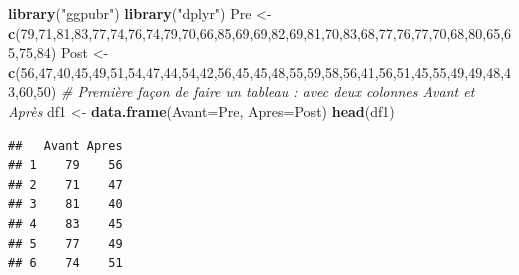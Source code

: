 \documentclass[
  11pt,
  french,
]{book}
\makeatletter
\newenvironment{Shaded}{\begin{snugshade}}{\end{snugshade}}
\newcommand{\CommentTok}[1]{\textcolor[rgb]{0.56,0.35,0.01}{\textit{#1}}}
\newcommand{\DataTypeTok}[1]{\textcolor[rgb]{0.13,0.29,0.53}{#1}}
\newcommand{\DecValTok}[1]{\textcolor[rgb]{0.00,0.00,0.81}{#1}}
\newcommand{\KeywordTok}[1]{\textcolor[rgb]{0.13,0.29,0.53}{\textbf{#1}}}
\newcommand{\NormalTok}[1]{#1}
\newcommand{\StringTok}[1]{\textcolor[rgb]{0.31,0.60,0.02}{#1}}
\newenvironment{kframe}{%
\medskip{}
\setlength{\fboxsep}{.8em}
 \def\at@end@of@kframe{}%
 \ifinner\ifhmode%
  \def\at@end@of@kframe{\end{minipage}}%
  \begin{minipage}{\columnwidth}%
 \fi\fi%
 \def\FrameCommand##1{\hskip\@totalleftmargin \hskip-\fboxsep
 \colorbox{shadecolor}{##1}\hskip-\fboxsep
     \hskip-\linewidth \hskip-\@totalleftmargin \hskip\columnwidth}%
 \MakeFramed {\advance\hsize-\width
   \@totalleftmargin\z@ \linewidth\hsize
   \@setminipage}}%
 {\par\unskip\endMakeFramed%
 \at@end@of@kframe}
\renewenvironment{Shaded}{\begin{kframe}}{\end{kframe}}
\makeatother
\begin{document}
\begin{Shaded}
\begin{Highlighting}[]
\KeywordTok{library}\NormalTok{(}\StringTok{"ggpubr"}\NormalTok{)}
\KeywordTok{library}\NormalTok{(}\StringTok{"dplyr"}\NormalTok{)}
\NormalTok{Pre <-}\StringTok{ }\KeywordTok{c}\NormalTok{(}\DecValTok{79}\NormalTok{,}\DecValTok{71}\NormalTok{,}\DecValTok{81}\NormalTok{,}\DecValTok{83}\NormalTok{,}\DecValTok{77}\NormalTok{,}\DecValTok{74}\NormalTok{,}\DecValTok{76}\NormalTok{,}\DecValTok{74}\NormalTok{,}\DecValTok{79}\NormalTok{,}\DecValTok{70}\NormalTok{,}\DecValTok{66}\NormalTok{,}\DecValTok{85}\NormalTok{,}\DecValTok{69}\NormalTok{,}\DecValTok{69}\NormalTok{,}\DecValTok{82}\NormalTok{,}\DecValTok{69}\NormalTok{,}\DecValTok{81}\NormalTok{,}\DecValTok{70}\NormalTok{,}\DecValTok{83}\NormalTok{,}\DecValTok{68}\NormalTok{,}\DecValTok{77}\NormalTok{,}\DecValTok{76}\NormalTok{,}\DecValTok{77}\NormalTok{,}\DecValTok{70}\NormalTok{,}\DecValTok{68}\NormalTok{,}\DecValTok{80}\NormalTok{,}\DecValTok{65}\NormalTok{,}\DecValTok{65}\NormalTok{,}\DecValTok{75}\NormalTok{,}\DecValTok{84}\NormalTok{)}
\NormalTok{Post <-}\StringTok{ }\KeywordTok{c}\NormalTok{(}\DecValTok{56}\NormalTok{,}\DecValTok{47}\NormalTok{,}\DecValTok{40}\NormalTok{,}\DecValTok{45}\NormalTok{,}\DecValTok{49}\NormalTok{,}\DecValTok{51}\NormalTok{,}\DecValTok{54}\NormalTok{,}\DecValTok{47}\NormalTok{,}\DecValTok{44}\NormalTok{,}\DecValTok{54}\NormalTok{,}\DecValTok{42}\NormalTok{,}\DecValTok{56}\NormalTok{,}\DecValTok{45}\NormalTok{,}\DecValTok{45}\NormalTok{,}\DecValTok{48}\NormalTok{,}\DecValTok{55}\NormalTok{,}\DecValTok{59}\NormalTok{,}\DecValTok{58}\NormalTok{,}\DecValTok{56}\NormalTok{,}\DecValTok{41}\NormalTok{,}\DecValTok{56}\NormalTok{,}\DecValTok{51}\NormalTok{,}\DecValTok{45}\NormalTok{,}\DecValTok{55}\NormalTok{,}\DecValTok{49}\NormalTok{,}\DecValTok{49}\NormalTok{,}\DecValTok{48}\NormalTok{,}\DecValTok{43}\NormalTok{,}\DecValTok{60}\NormalTok{,}\DecValTok{50}\NormalTok{)}
\CommentTok{# Première façon de faire un tableau : avec deux colonnes Avant et Après}
\NormalTok{df1 <-}\StringTok{ }\KeywordTok{data.frame}\NormalTok{(}\DataTypeTok{Avant=}\NormalTok{Pre, }\DataTypeTok{Apres=}\NormalTok{Post)}
\KeywordTok{head}\NormalTok{(df1)}
\end{Highlighting}
\end{Shaded}

\begin{verbatim}
##   Avant Apres
## 1    79    56
## 2    71    47
## 3    81    40
## 4    83    45
## 5    77    49
## 6    74    51
\end{verbatim}
\end{document}
